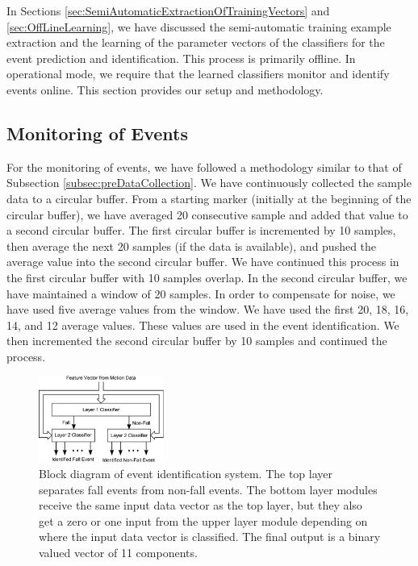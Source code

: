 \documentclass[]{IEEEtran}
\begin{document}
In Sections \ref{sec:SemiAutomaticExtractionOfTrainingVectors} and
\ref{sec:OffLineLearning}, we have discussed the semi-automatic training
example extraction and the learning of the parameter vectors of the classifiers
for the event prediction and identification. This process is primarily offline.
In operational mode, we require that the learned classifiers monitor and
identify events online. This section provides our setup and methodology.  



\subsection{Monitoring of Events}

For the monitoring of events, we have followed a methodology similar to that of
Subsection \ref{subsec:preDataCollection}. We have continuously collected the
sample data to a circular buffer. From a starting marker (initially at the
beginning of the circular buffer), we have averaged 20 consecutive sample and
added that value to a second circular buffer. The first circular buffer is
incremented by 10 samples, then average the next 20 samples (if the data is
available), and pushed  the average value into the second circular buffer. We
have continued this process in the first circular buffer with 10 samples
overlap. In the second circular buffer, we have maintained a window of 20
samples.  In order to compensate for noise, we have used five average values
from the window. We have used the first 20, 18, 16, 14, and 12 average values.
These  values are used in the event identification. We then incremented the
second circular buffer by 10 samples and continued the process.  

\begin{figure}[!tbh]
	\centering
		\includegraphics[width=0.365\textwidth]{figures/TrainedIdentificationModule.eps}
	\caption{Block diagram of event identification system. The top layer
separates fall events from non-fall events. The bottom layer modules receive
the same input data vector as the top layer, but they also get a zero or one
input from the upper layer module depending on where the input data vector is
classified. The final output is a binary valued vector of 11 components.}
\label{fig:TrainedIdentificationModule}
\end{figure}
\end{document}
